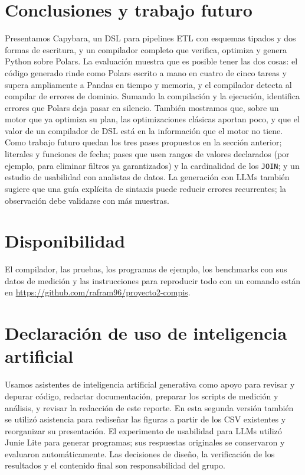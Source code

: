 \documentclass[sigplan,screen,nonacm]{acmart}
\begin{document}
\section{Conclusiones y trabajo futuro}

Presentamos Capybara, un DSL para pipelines ETL con esquemas tipados y dos formas de escritura, y un
compilador completo que verifica, optimiza y genera Python sobre Polars. La evaluación muestra
que es posible tener las dos cosas: el código generado rinde como Polars escrito a mano en
cuatro de cinco tareas y supera ampliamente a Pandas en tiempo y memoria, y el compilador
detecta al compilar \erroresCompilacion{} de \erroresTotal{} errores de dominio. Sumando
la compilación y la ejecución, identifica \erroresSilenciososDetectados{} errores que Polars
deja pasar en silencio. También mostramos que, sobre
un motor que ya optimiza su plan, las optimizaciones clásicas aportan poco, y que el valor
de un compilador de DSL está en la información que el motor no tiene. Como trabajo futuro
quedan los tres pases propuestos en la sección anterior; literales y funciones de fecha;
pases que usen rangos de valores declarados (por ejemplo, para eliminar filtros ya garantizados)
y la cardinalidad de los \texttt{JOIN}; y un estudio de usabilidad con analistas de datos.
La generación con LLMs también sugiere que una guía explícita de sintaxis puede
reducir errores recurrentes; la observación debe validarse con más muestras.

\section*{Disponibilidad}
El compilador, las pruebas, los programas de ejemplo, los benchmarks con sus datos de
medición y las instrucciones para reproducir todo con un comando están en
\url{https://github.com/rafram96/proyecto2-compis}.

\section*{Declaración de uso de inteligencia artificial}
Usamos asistentes de inteligencia artificial generativa como apoyo para revisar y depurar
código, redactar documentación, preparar los scripts de medición y análisis, y revisar la
redacción de este reporte. En esta segunda versión también se utilizó asistencia para
rediseñar las figuras a partir de los CSV existentes y reorganizar su presentación.
El experimento de usabilidad para LLMs utilizó Junie Lite para generar programas;
sus respuestas originales se conservaron y evaluaron automáticamente.
Las decisiones de diseño, la verificación de los resultados y el
contenido final son responsabilidad del grupo.
\end{document}
